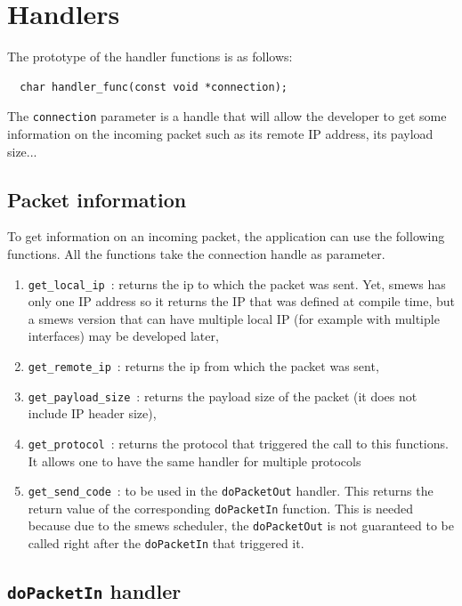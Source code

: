 \documentclass{report}
\begin{document}
\section{Handlers}
\label{sec:handlers}

The prototype of the handler functions is as follows:

\begin{lstlisting}
  char handler_func(const void *connection);
\end{lstlisting}

The \verb!connection! parameter is a handle that will allow the developer to
get some information on the incoming packet such as its remote IP address, its
payload size... 

\subsection{Packet information}
\label{sec:packetattributes}

To get information on an incoming packet, the application can use the following
functions. All the functions take the connection handle as parameter.

\begin{enumerate}
\item \verb!get_local_ip!~: returns the ip to which the packet was sent. Yet,
  smews has only one IP address so it returns the IP that was defined at
  compile time, but a smews version that can have multiple local IP (for
  example with multiple interfaces) may be developed later,
\item \verb!get_remote_ip!~: returns the ip from which the packet was sent,
\item \verb!get_payload_size!~: returns the payload size of the packet (it does not include IP header size),
\item \verb!get_protocol!~: returns the protocol that triggered the call to
  this functions. It allows one to have the same handler for multiple protocols
\item \verb!get_send_code!~: to be used in the \texttt{doPacketOut}
  handler. This returns the return value of the corresponding
  \texttt{doPacketIn} function. This is needed because due to the smews
  scheduler, the \texttt{doPacketOut} is not guaranteed to be called right
  after the \texttt{doPacketIn} that triggered it.
\end{enumerate}

\subsection{\texttt{doPacketIn} handler}
\label{sec:dopacketin}
\end{document}

